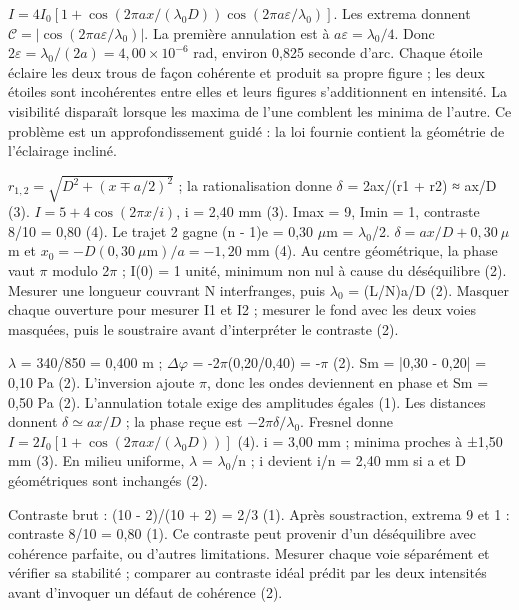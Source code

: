 $I=4I_0[1+\cos(2\pi ax/(\lambda_0D))\cos(2\pi a\varepsilon/\lambda_0)]$. Les extrema donnent $\mathcal C=|\cos(2\pi a\varepsilon/\lambda_0)|$. La première annulation est à $a\varepsilon=\lambda_0/4$. Donc $2\varepsilon=\lambda_0/(2a)=4{,}00\times10^{-6}$ rad, environ 0,825 seconde d’arc. Chaque étoile éclaire les deux trous de façon cohérente et produit sa propre figure ; les deux étoiles sont incohérentes entre elles et leurs figures s’additionnent en intensité. La visibilité disparaît lorsque les maxima de l’une comblent les minima de l’autre. Ce problème est un approfondissement guidé : la loi fournie contient la géométrie de l’éclairage incliné.

$r_{1,2}=\sqrt{D^2+(x\mp a/2)^2}$ ; la rationalisation donne \ensuremath{\delta} = 2ax/(r1 + r2) ≈ ax/D (3). $I=5+4\cos(2\pi x/i)$, i = 2,40 mm (3). Imax = 9, Imin = 1, contraste 8/10 = 0,80 (4).
Le trajet 2 gagne (n - 1)e = 0,30 \ensuremath{\mu}m = \ensuremath{\lambda_0}/2. $\delta=ax/D+0{,}30\ \mu$m et $x_0=-D(0{,}30\ \mu\mathrm m)/a=-1{,}20$ mm (4). Au centre géométrique, la phase vaut \ensuremath{\pi} modulo 2\ensuremath{\pi} ; I(0) = 1 unité, minimum non nul à cause du déséquilibre (2).
Mesurer une longueur couvrant N interfranges, puis \ensuremath{\lambda_0} = (L/N)a/D (2). Masquer chaque ouverture pour mesurer I1 et I2 ; mesurer le fond avec les deux voies masquées, puis le soustraire avant d’interpréter le contraste (2).


\ensuremath{\lambda} = 340/850 = 0,400 m ; \ensuremath{\Delta}\ensuremath{\varphi} = -2\ensuremath{\pi}(0,20/0,40) = -\ensuremath{\pi} (2). Sm = |0,30 - 0,20| = 0,10 Pa (2). L’inversion ajoute \ensuremath{\pi}, donc les ondes deviennent en phase et Sm = 0,50 Pa (2). L’annulation totale exige des amplitudes égales (1).
Les distances donnent $\delta\simeq ax/D$ ; la phase reçue est $-2\pi\delta/\lambda_0$. Fresnel donne $I=2I_0[1+\cos(2\pi ax/(\lambda_0D))]$ (4). i = 3,00 mm ; minima proches à ±1,50 mm (3). En milieu uniforme, \ensuremath{\lambda} = \ensuremath{\lambda_0}/n ; i devient i/n = 2,40 mm si a et D géométriques sont inchangés (2).


Contraste brut : (10 - 2)/(10 + 2) = 2/3 (1). Après soustraction, extrema 9 et 1 : contraste 8/10 = 0,80 (1). Ce contraste peut provenir d’un déséquilibre avec cohérence parfaite, ou d’autres limitations. Mesurer chaque voie séparément et vérifier sa stabilité ; comparer au contraste idéal prédit par les deux intensités avant d’invoquer un défaut de cohérence (2).


